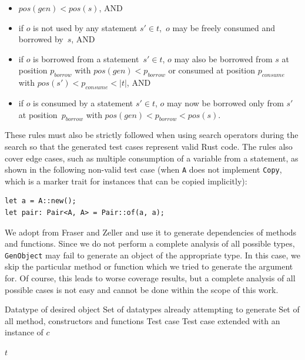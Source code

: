 \documentclass[paper=a4,%
  twoside,%
  BCOR4mm,%
  abstract=true,%
  toc=bibliography,%
  chapterprefix=true,%
  toc=bibliographynumbered,%
  open=right,%
  english,%
  pagesize=pdftex]{scrreprt}
\newcommand{\Desc}[2]{\State \makebox[2em][l]{#1}#2}
\begin{document}
\begin{itemize}
    \item $pos(gen) < pos(s)$, AND
    \item if $o$ is not used by any statement $s' \in t$,~$o$ may be freely consumed and borrowed by~$s$, AND
    \item if $o$ is borrowed from a statement~$s' \in t$, $o$ may also be borrowed from $s$ at position $p_{borrow}$ with $pos(gen) < p_{borrow}$ or consumed at position $p_{consume}$ with $pos(s') < p_{consume} < \left|t\right|$, AND
    \item if $o$ is consumed by a statement $s' \in t$, $o$ may now be borrowed only from $s'$ at position~$p_{borrow}$ with $pos(gen) < p_{borrow} < pos(s)$.
\end{itemize}

These rules must also be strictly followed when using search operators during the search so that the generated test cases represent valid Rust code. The rules also cover edge cases, such as multiple consumption of a variable from a statement, as shown in the following non-valid test case (when \texttt{A} does not implement \texttt{Copy}, which is a marker trait for instances that can be copied implicitly):
\begin{lstlisting}[style=boxed, caption={}]
let a = A::new();
let pair: Pair<A, A> = Pair::of(a, a);
\end{lstlisting}

We adopt  from Fraser and Zeller and use it to generate dependencies of methods and functions. Since we do not perform a complete analysis of all possible types, \texttt{GenObject} may fail to generate an object of the appropriate type. In this case, we skip the particular method or function which we tried to generate the argument for. Of course, this leads to worse coverage results, but a complete analysis of all possible cases is not easy and cannot be done within the scope of this work.

\begin{algorithm}[t]
\caption{$GenObject(c, G, M, t)$}
\label{alg:genobject}
\begin{algorithmic}
\Input
  \Desc{$c$}{Datatype of desired object}
  \Desc{$G$}{Set of datatypes already attempting to generate}
  \Desc{$M$}{Set of all method, constructors and functions}
  \Desc{$t$}{Test case}
\EndInput
\Output
  \Desc{$t$}{Test case extended with an instance of $c$}
\EndOutput
{}

  \EndIf
\EndFor
{}
\State \Return $t$
\end{algorithmic}
\end{algorithm}
\end{document}
